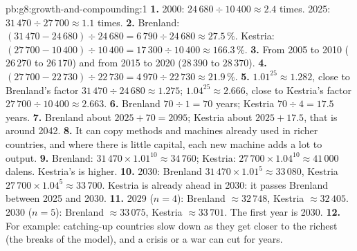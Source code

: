 \begin{solution}{pb:g8:growth-and-compounding:1}
\textbf{1.} 2000: $24\,680 \div 10\,400 \approx 2.4$ times. 2025: $31\,470 \div 27\,700 \approx 1.1$
times.
\textbf{2.} Brenland: $(31\,470 - 24\,680) \div 24\,680 = 6\,790 \div 24\,680 \approx 27.5\,\%$.
Kestria: $(27\,700 - 10\,400) \div 10\,400 = 17\,300 \div 10\,400 \approx 166.3\,\%$.
\textbf{3.} From 2005 to 2010 ($26\,270$ to $26\,170$) and from 2015 to 2020 ($28\,390$ to
$28\,370$).
\textbf{4.} $(27\,700 - 22\,730) \div 22\,730 = 4\,970 \div 22\,730 \approx 21.9\,\%$.
\textbf{5.} $1.01^{25} \approx 1.282$, close to Brenland's factor $31\,470 \div 24\,680 \approx 1.275$;
$1.04^{25} \approx 2.666$, close to Kestria's factor $27\,700 \div 10\,400 \approx 2.663$.
\textbf{6.} Brenland $70 \div 1 = 70$ years; Kestria $70 \div 4 = 17.5$ years.
\textbf{7.} Brenland about $2025 + 70 = 2095$; Kestria about $2025 + 17.5$, that is around 2042.
\textbf{8.} It can copy methods and machines already used in richer countries, and where there is
little capital, each new machine adds a lot to output.
\textbf{9.} Brenland: $31\,470 \times 1.01^{10} \approx 34\,760$; Kestria: $27\,700 \times 1.04^{10}
\approx 41\,000$ dalens. Kestria's is higher.
\textbf{10.} 2030: Brenland $31\,470 \times 1.01^{5} \approx 33\,080$, Kestria $27\,700 \times
1.04^{5} \approx 33\,700$. Kestria is already ahead in 2030: it passes Brenland between 2025 and 2030.
\textbf{11.} 2029 ($n = 4$): Brenland $\approx 32\,748$, Kestria $\approx 32\,405$. 2030 ($n = 5$):
Brenland $\approx 33\,075$, Kestria $\approx 33\,701$. The first year is 2030.
\textbf{12.} For example: catching-up countries slow down as they get closer to the richest (the
breaks of the model), and a crisis or a war can cut  for years.
\end{solution}
